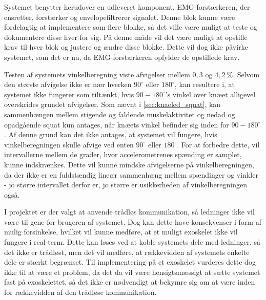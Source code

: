 
Systemet benytter herudover en udleveret komponent, EMG-forstærkeren, der ensretter, forstærker og envelopefiltrerer signalet. Denne blok kunne være fordelagtig at implementere som flere blokke, så det ville være muligt at teste og dokumentere disse hver for sig. På denne måde vil det være muligt at opstille krav til hver blok og justere og ændre disse blokke. Dette vil dog ikke påvirke systemet, som det er nu, da EMG-forstærkeren opfylder de opstillede krav. %

Testen af systemets vinkelberegning viste afvigelser mellem $0,3$ og $4,2~\%$. Selvom den største afvigelse ikke er nær hverken $90^{\circ}$ eller $180^{\circ}$, kan resultere i, at systemet ikke fungerer som tiltænkt, hvis $90-180^{\circ}$'s vinkel over knæet alligevel overskrides grundet afvigelser. Som nævnt i \autoref{sec:knaeled_squat}, kan sammenhængen mellem stigende og faldende muskelaktivitet og nedad og opadgående squat kun antages, når knæets vinkel befinder sig inden for $90-180^{\circ}$. Af denne grund kan det ikke antages, at systemet vil fungere, hvis vinkelberegningen skulle afvige ved enten $90^{\circ}$ eller $180^{\circ}$. For at forbedre dette, vil intervallerne mellem de grader, hvor accelerometrenes spænding er samplet, kunne indskrænkes. Dette vil kunne mindske afvigelserne på vinkelberegningen, da der ikke er en fuldstændig lineær sammenhæng mellem spændinger og vinkler - jo større intervallet derfor er, jo større er usikkerheden af vinkelberegningen også.

I projektet er der valgt at anvende trådløs kommunikation, så ledninger ikke vil være til gene for brugeren af systemet. Dog kan dette have konsekvenser i form af mulig forsinkelse, hvilket vil kunne medføre, at et muligt exoskelet ikke vil fungere i real-term. Dette kan løses ved at koble systemets dele med ledninger, så det ikke er trådløst, men det vil medføre, at rækkevidden af systemets enkelte dele er stærkt begrænset. Til implementering på et exoskelet vurderes dette dog ikke til at være et problem, da det da vil være hensigtsmæssigt at sætte systemet fast på exoskelettet, så det ikke er nødvendigt at bekymre sig om at være inden for rækkevidden af den trådløse kommunikation.



